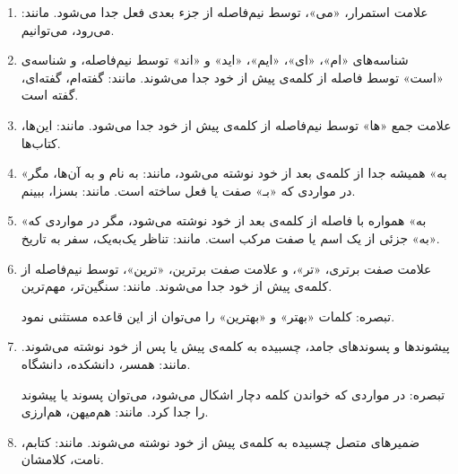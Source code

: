 \begin{enumerate}


\item 
علامت استمرار، «می»، توسط نیم‌فاصله از جزء‌ بعدی فعل جدا می‌شود. مانند: می‌رود، می‌توانیم.
\item 
شناسه‌های «ام»، «ای»، «ایم»، «اید» و «اند» توسط نیم‌فاصله، و شناسه‌ی «است» توسط فاصله از کلمه‌ی پیش از خود جدا می‌شوند. مانند: گفته‌ام، گفته‌ای، گفته است.
\item 
علامت جمع «ها» توسط نیم‌فاصله از کلمه‌ی پیش از خود جدا می‌شود. مانند: این‌ها، کتاب‌ها.
\item 
«به» همیشه جدا از کلمه‌ی بعد از خود نوشته می‌شود، مانند: به‌ نام و به آن‌ها، مگر در مواردی که «بـ» صفت یا فعل ساخته است. مانند: بسزا، ببینم.
\item 
«به» همواره با فاصله از کلمه‌ی بعد از خود نوشته می‌شود، مگر در مواردی که «به» جزئی از یک اسم یا صفت مرکب است. مانند: تناظر یک‌به‌یک، سفر به تاریخ. 
%
%
%

%

\item 
علامت صفت برتری، «تر»، و علامت صفت برترین، «ترین»، توسط نیم‌فاصله از کلمه‌ی پیش از خود جدا می‌شوند. 
مانند: سنگین‌تر، مهم‌ترین.

        تبصره‌: کلمات «بهتر» و «بهترین» را می‌توان از این قاعده مستثنی نمود. 

\item 
پیشوندها و پسوندهای جامد، چسبیده به کلمه‌ی پیش یا پس از خود نوشته می‌شوند. مانند: همسر، دانشکده، دانشگاه.

        تبصره‌: در مواردی که خواندن کلمه دچار اشکال می‌شود، می‌توان پسوند یا پیشوند را جدا کرد. مانند: هم‌میهن، هم‌ارزی. 

\item 
ضمیرهای متصل چسبیده به کلمه‌ی پیش‌ از خود نوشته می‌شوند. مانند: کتابم، نامت، کلامشان. 

\end{enumerate}


